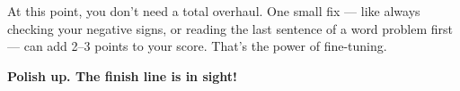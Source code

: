 {\begin{tcolorbox}[
    enhanced,
    colback=funYellowLight,
    colframe=funYellow!60,
    arc=10pt,
    boxrule=1pt,
    left=6mm, right=6mm, top=4mm, bottom=4mm,
]
\vspace{2mm}

At this point, you don't need a total overhaul. One small fix — like always checking your negative signs, or reading the last sentence of a word problem first — can add 2--3 points to your score. That's the power of fine-tuning.
\end{tcolorbox}

\vspace{4mm}

\begin{center}
{\large\bfseries\color{funOrangeDark} \faRocket\hspace{2mm}Polish up. The finish line is in sight!\hspace{2mm}\faRocket}
\end{center}

}
\newpage
